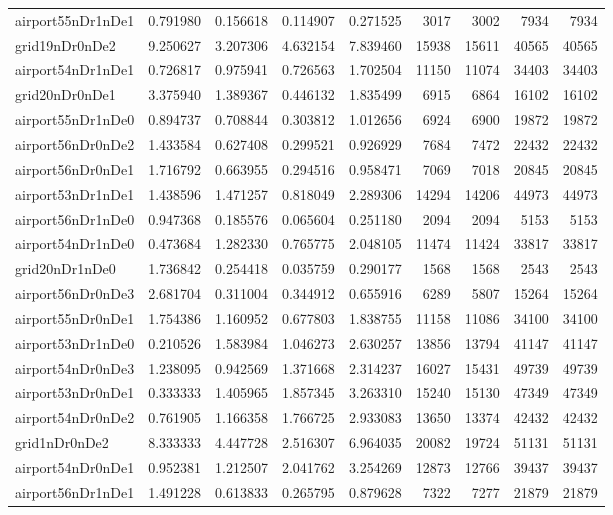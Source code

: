 \begin{longtable}{|l|r|r|r|r|r|r|r|r|}
airport55nDr1nDe1 & 0.791980 & 0.156618 & 0.114907 & 0.271525 & 3017 & 3002 & 7934 & 7934 \\
grid19nDr0nDe2 & 9.250627 & 3.207306 & 4.632154 & 7.839460 & 15938 & 15611 & 40565 & 40565 \\
airport54nDr1nDe1 & 0.726817 & 0.975941 & 0.726563 & 1.702504 & 11150 & 11074 & 34403 & 34403 \\
grid20nDr0nDe1 & 3.375940 & 1.389367 & 0.446132 & 1.835499 & 6915 & 6864 & 16102 & 16102 \\
airport55nDr1nDe0 & 0.894737 & 0.708844 & 0.303812 & 1.012656 & 6924 & 6900 & 19872 & 19872 \\
airport56nDr0nDe2 & 1.433584 & 0.627408 & 0.299521 & 0.926929 & 7684 & 7472 & 22432 & 22432 \\
airport56nDr0nDe1 & 1.716792 & 0.663955 & 0.294516 & 0.958471 & 7069 & 7018 & 20845 & 20845 \\
airport53nDr1nDe1 & 1.438596 & 1.471257 & 0.818049 & 2.289306 & 14294 & 14206 & 44973 & 44973 \\
airport56nDr1nDe0 & 0.947368 & 0.185576 & 0.065604 & 0.251180 & 2094 & 2094 & 5153 & 5153 \\
airport54nDr1nDe0 & 0.473684 & 1.282330 & 0.765775 & 2.048105 & 11474 & 11424 & 33817 & 33817 \\
grid20nDr1nDe0 & 1.736842 & 0.254418 & 0.035759 & 0.290177 & 1568 & 1568 & 2543 & 2543 \\
airport56nDr0nDe3 & 2.681704 & 0.311004 & 0.344912 & 0.655916 & 6289 & 5807 & 15264 & 15264 \\
airport55nDr0nDe1 & 1.754386 & 1.160952 & 0.677803 & 1.838755 & 11158 & 11086 & 34100 & 34100 \\
airport53nDr1nDe0 & 0.210526 & 1.583984 & 1.046273 & 2.630257 & 13856 & 13794 & 41147 & 41147 \\
airport54nDr0nDe3 & 1.238095 & 0.942569 & 1.371668 & 2.314237 & 16027 & 15431 & 49739 & 49739 \\
airport53nDr0nDe1 & 0.333333 & 1.405965 & 1.857345 & 3.263310 & 15240 & 15130 & 47349 & 47349 \\
airport54nDr0nDe2 & 0.761905 & 1.166358 & 1.766725 & 2.933083 & 13650 & 13374 & 42432 & 42432 \\
grid1nDr0nDe2 & 8.333333 & 4.447728 & 2.516307 & 6.964035 & 20082 & 19724 & 51131 & 51131 \\
airport54nDr0nDe1 & 0.952381 & 1.212507 & 2.041762 & 3.254269 & 12873 & 12766 & 39437 & 39437 \\
airport56nDr1nDe1 & 1.491228 & 0.613833 & 0.265795 & 0.879628 & 7322 & 7277 & 21879 & 21879 \\

\end{longtable}
